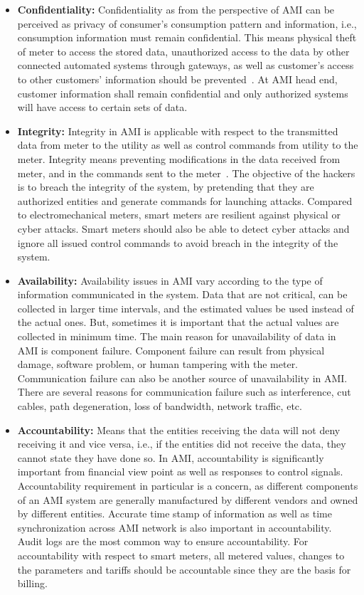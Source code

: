 \begin{itemize}
\item \textbf{Confidentiality:} Confidentiality as from the perspective of AMI can be perceived as privacy of consumer's consumption pattern and information, i.e., consumption information must remain confidential. This means physical theft of meter to access the stored data, unauthorized access to the data by other connected automated systems through gateways, as well as customer’s access to other customers’ information should be prevented~\cite{Anzalchi2015}. At AMI head end, customer information shall remain confidential and only authorized systems will have access to certain sets of data.
\item \textbf{Integrity:} Integrity in AMI is applicable with respect to the transmitted data from meter to the utility as well as control commands from utility to the meter. Integrity means preventing modifications in the data received from meter, and in the commands sent to the meter~\cite{Yan13}. The objective of the hackers is to breach the integrity of the system, by pretending that they are authorized entities and generate commands for launching attacks. Compared to electromechanical meters, smart meters are resilient against physical or cyber attacks. Smart meters should also be able to detect cyber attacks and ignore all issued control commands to avoid breach in the integrity of the system.
\item \textbf{Availability:} Availability issues in AMI vary according to the type of information communicated in the system. Data that are not critical, can be collected in larger time intervals, and the estimated values be used instead of the actual ones. But, sometimes it is important that the actual values are collected in minimum time. The main reason for unavailability of data in AMI is component failure. Component failure can result from physical damage, software problem, or human tampering with the meter. Communication failure can also be another source of unavailability in AMI. There are several reasons for communication failure such as interference, cut cables, path degeneration, loss of bandwidth, network traffic, etc.
\item \textbf{Accountability:} Means that the entities receiving the data will not deny receiving it and vice versa, i.e., if the entities did not receive the data, they cannot state they have done so. In AMI, accountability is significantly important from financial view point as well as responses to control signals. Accountability requirement in particular is a concern, as different components of an AMI system are generally manufactured by different vendors and owned by different entities. Accurate time stamp of information as well as time synchronization across AMI network is also important in accountability. Audit logs are the most common way to ensure accountability. For accountability with respect to smart meters, all metered values, changes to the parameters and tariffs should be accountable since they are the basis for billing.
\end{itemize}

